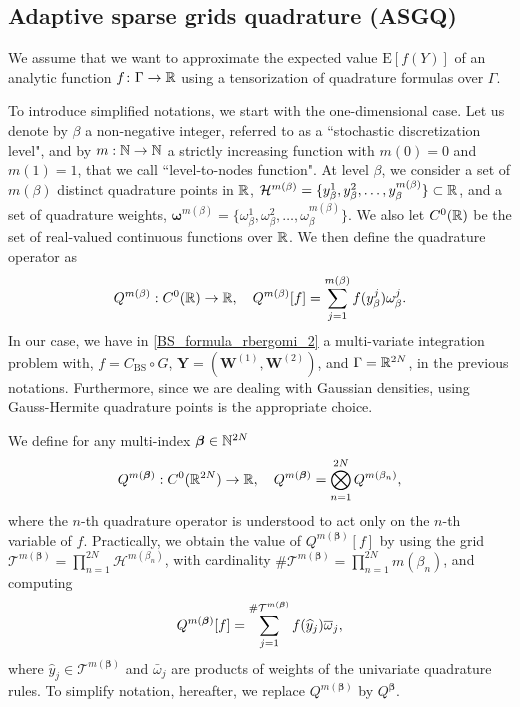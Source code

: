 \subsection{Adaptive sparse grids quadrature (ASGQ)}\label{sec:Details of the MISC}

We assume that we want to approximate the expected value $\text{E}[f(Y)]$ of an analytic function $f\colon \Gamma \to \mathbb{R}$ using a tensorization of quadrature formulas over $\Gamma$.

To introduce simplified notations, we start with the one-dimensional case. Let us denote by $\beta$ a non-negative integer, referred to as a ``stochastic discretization level", and by $m: \mathbb{N} \rightarrow \mathbb{N}$  a strictly increasing function with $m(0)=0$ and $m(1)=1$, that we call  ``level-to-nodes function". At level $\beta$, we consider a set of $m(\beta)$ distinct quadrature points in $\mathbb{R}$, $\mathcal{H}^{m(\beta)}=\{y^1_\beta,y^2_\beta,\dots,y_\beta^{m(\beta)}\} \subset \mathbb{R}$, and a set of quadrature weights, $\boldsymbol{\omega}^{m(\beta)}=\{\omega^1_\beta,\omega^2_\beta,\dots,\omega_\beta^{m(\beta)}\}$. We also let $C^0(\mathbb{R})$ be the set of real-valued continuous functions over $\mathbb{R}$. We then define the quadrature operator as
\begin{equation*}
Q^{m(\beta)}:C^0(\mathbb{R}) \rightarrow \mathbb{R}, \quad Q^{m(\beta)}[f]= \sum_{j=1}^{m(\beta)} f(y^j_\beta) \omega_\beta^j.
\end{equation*}
In our case, we have in \eqref{BS_formula_rbergomi_2} a multi-variate integration problem with,  $f=C_{\text{BS}}\circ G$, $\mathbf{Y}=(\mathbf{W}^{(1)},\mathbf{W}^{(2)})$, and  $\Gamma=\mathbb{R}^{2N}$, in the previous notations. Furthermore, since we are dealing with Gaussian densities, using Gauss-Hermite quadrature points is the appropriate choice.

We define for any multi-index $\boldsymbol{\beta} \in \mathbb{N}^{2N}$
$$Q^{m(\boldsymbol{\beta})}: C^0(\mathbb{R}^{2N}) \rightarrow \mathbb{R},\quad  Q^{m(\boldsymbol{\beta})}= \bigotimes_{n = 1}^{2N} Q^{m(\beta_n)} , $$
where the $n$-th quadrature operator is understood to act only on the $n$-th variable of $f$. Practically, we obtain the value of $Q^{m(\boldsymbol{\beta})}[f]$  by using the grid $\mathcal{T}^{m(\boldsymbol{\beta})}= \prod_{n = 1}^{2N}  \mathcal{H}^{m(\beta_n)}$, with cardinality $\#\mathcal{T}^{m(\boldsymbol{\beta})}=\prod_{n=1}^{2N} m (\beta_n)$, and computing
$$ Q^{m(\boldsymbol{\beta})}[f]= \sum_{j=1}^{\#\mathcal{T}^{m(\boldsymbol{\beta})}} f(\widehat{y}_j) \overline{\omega}_j ,$$
where $\hat{y}_j \in \mathcal{T}^{m(\boldsymbol{\beta})}$ and $\bar{\omega}_j$ are  products of weights of the univariate quadrature rules. To simplify notation, hereafter, we replace  $Q^{m(\boldsymbol{\beta})}$ by $Q^{\boldsymbol{\beta}}$.

